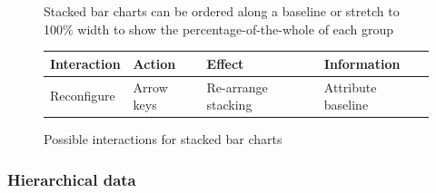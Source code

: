 \documentclass{article}
\begin{document}
\begin{figure}
  \centering
    \qquad
    \caption{Stacked bar charts can be ordered along a baseline or stretch to 100\% width to show the percentage-of-the-whole of each group}%
    \label{fig:concept:chart-types:stacked-bar-chart}
\end{figure}

\begin{figure}
  \begin{center}
    \begin{tabular}{l l l l}
      Interaction & Action & Effect & Information \\
      \hline
      Reconfigure & Arrow keys  & Re-arrange stacking     &  Attribute baseline  \\
    \end{tabular}
  \end{center}
  \caption{Possible interactions for stacked bar charts}
  \label{tab:concept:chart-types:bar-charts}
\end{figure}

\subsubsection{Hierarchical data}
\end{document}
